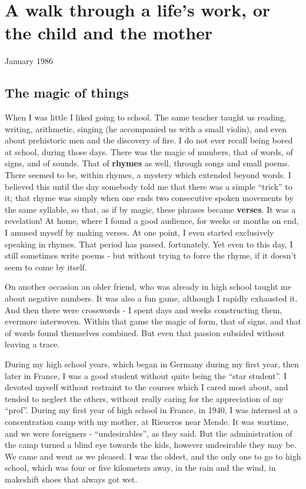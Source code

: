 \chapter{A walk through a life's work, or the child and the mother}

January 1986

\section{The magic of things}

When I was little I liked going to school. The same teacher taught us reading,
writing, arithmetic, singing (he accompanied us with a small violin), and even
about prehistoric men and the discovery of fire.
I do not ever recall being bored at school, during those days.
There was the magic of numbers, that of words, of signs, and of sounds.
That of \textbf{rhymes} as well, through songs and small poems. 
There seemed to be, within rhymes, a mystery which extended beyond words.
I believed this until the day somebody told me that there was a simple ``trick'' to it;
that rhyme was simply when one ends
two consecutive spoken movements by the same syllable, so that, as if by magic, these
phrases became \textbf{verses}. It was a revelation! 
At home, where I found a good audience, for weeks or months on end, I amused myself by
making verses. At one point, I even started exclusively speaking in rhymes. 
That period has passed, fortunately. 
Yet even to this day, I still sometimes write poems - but without trying to force the
rhyme, if it doesn't seem to come by itself. 

On another occasion an older friend, who was already in high school taught me about
negative numbers. It was also a fun game, although I rapidly exhausted it. 
And then there were crosswords - I spent days and weeks constructing them, evermore
interwoven. Within that game the magic of form, that of signs, and that of words found
themselves combined. But even that passion subsided without leaving a trace. 

During my high school years, which began in Germany during my first year, then later in
France, I was a good student without quite being the ``star student''.
I devoted myself without restraint to the
courses which I cared most about, and tended to neglect the others, without really caring
for the appreciation of my ``prof''. 
During my first year of high school in France, in 1940, I was interned at a concentration
camp with my mother, at Rieucros near Mende. It was wartime, and we were foreigners -
``undesirables'', as they said. But the administration of the camp turned a blind eye
towards the kids, however undesirable they may be. We came and went as we pleased. 
I was the oldest, and the only one to go to high school, which was four or five kilometers
away, in the rain and the wind, in makeshift shoes 
that always got wet. 

